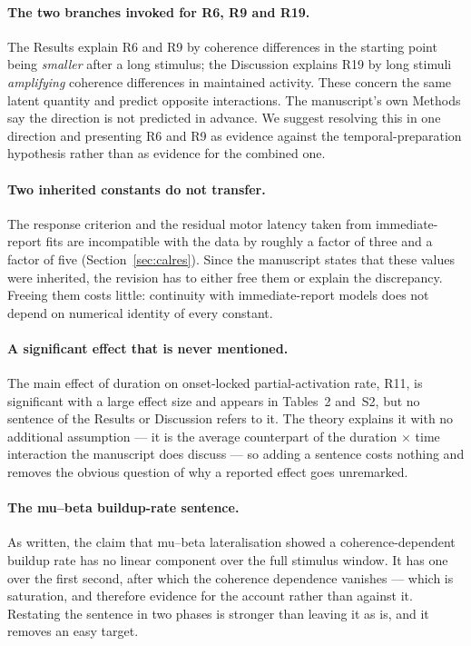 \documentclass[a4paper,11pt]{article}
\newcommand{\1}{\mathbbm{1}}
\begin{document}
\paragraph{The two branches invoked for R6, R9 and R19.} The Results explain R6 and R9 by coherence
differences in the starting point being \emph{smaller} after a long stimulus; the
Discussion explains R19 by long stimuli \emph{amplifying} coherence differences in
maintained activity. These concern the same latent quantity and predict opposite
interactions. The manuscript's own Methods say the direction is not predicted in
advance. We suggest resolving this in one direction and presenting R6 and R9 as evidence
against the temporal-preparation hypothesis rather than as evidence for the combined
one.

\paragraph{Two inherited constants do not transfer.} The response criterion and the
residual motor latency taken from immediate-report fits are incompatible with the data by
roughly a factor of three and a factor of five (Section~\ref{sec:calres}). Since the
manuscript states that these values were inherited, the revision has to either free them
or explain the discrepancy. Freeing them costs little: continuity with immediate-report
models does not depend on numerical identity of every constant.

\paragraph{A significant effect that is never mentioned.} The main effect of duration on
onset-locked partial-activation rate, R11, is significant with a large effect size and
appears in Tables~2 and~S2, but no sentence of the Results or Discussion refers to it. The
theory explains it with no additional assumption --- it is the average counterpart of the
duration $\times$ time interaction the manuscript does discuss --- so adding a sentence
costs nothing and removes the obvious question of why a reported effect goes unremarked.

\paragraph{The mu--beta buildup-rate sentence.} As written, the claim that mu--beta
lateralisation showed a coherence-dependent buildup rate has no linear component over
the full stimulus window. It has one over the first second, after which the coherence
dependence vanishes --- which is saturation, and therefore evidence for the account
rather than against it. Restating the sentence in two phases is stronger than leaving it
as is, and it removes an easy target.
\end{document}
